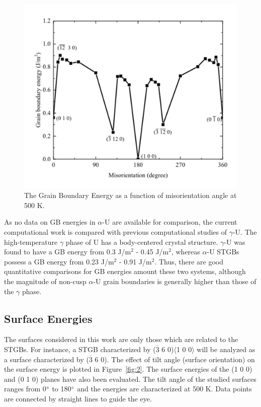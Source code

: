 \documentclass{anstrans}
\begin{document}
\begin{figure}[ht] %
  \centering
  \includegraphics[width=\columnwidth]{fig1}
  \caption{The Grain Boundary Energy as a function of misorientation angle at 500 K.}
  \label{fig:1}
\end{figure}

As no data on GB energies in $\alpha$-U are available for comparison, the current computational work is compared with previous computational studies of $\gamma$-U. The high-temperature $\gamma$ phase of U has a body-centered crystal structure. $\gamma$-U \cite{beeler2018} was found to have a GB energy from 0.3 J/m${^2}$ - 0.45 J/m${^2}$, whereas $\alpha$-U STGBs possess a GB energy from 0.23 J/m${^2}$ - 0.91 J/m${^2}$. Thus, there are good quantitative comparisons for GB energies amount these two systems, although the magnitude of non-cusp $\alpha$-U grain boundaries is generally higher than those of the $\gamma$ phase.

\subsection{Surface Energies}

The surfaces considered in this work are only those which are related to the STGBs. For instance, a STGB characterized by ($\overline{3}$ 6 0)$\langle$1 0 0$\rangle$ will be analyzed as a surface characterized by ($\overline{3}$ 6 0). The effect of tilt angle (surface orientation) on the surface energy is plotted in Figure~\ref{fig:2}. The surface energies of the (1 0 0) and (0 1 0) planes have also been evaluated. The tilt angle of the studied surfaces ranges from 0$\degree$ to 180$\degree$ and the energies are characterized at 500 K. Data points are connected by straight lines to guide the eye.
\end{document}
